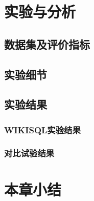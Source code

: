 \section{实验与分析}
\subsection{数据集及评价指标}
\subsection{实验细节}
\subsection{实验结果}
\subsubsection{WIKISQL实验结果}
\subsubsection{对比试验结果}



\section{本章小结}